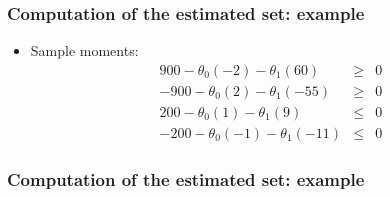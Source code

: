 \documentclass[10pt,letterpaper]{beamer}
\begin{document}

\begin{frame}
\frametitle{Computation of the estimated set: example}

\begin{itemize}
\item Sample moments:  
\begin{eqnarray*}
900-\theta _{0}(-2)-\theta _{1}(60) &\geq &0 \\
-900-\theta _{0}(2)-\theta _{1}(-55) &\geq &0 \\
200-\theta _{0}(1)-\theta _{1}(9) &\leq &0 \\
-200-\theta _{0}(-1)-\theta _{1}(-11) &\leq &0
\end{eqnarray*}
\end{itemize}
\end{frame}


\begin{frame}
\frametitle{Computation of the estimated set: example}

\begin{figure}[h!]
\begin{center}
 
\end{center}
\end{figure}
\end{frame}
\end{document}
